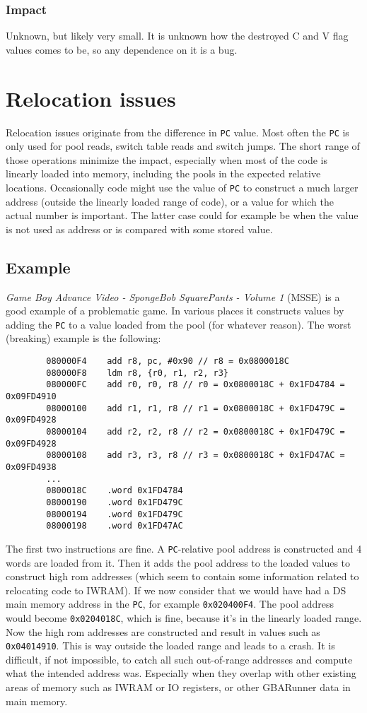 \documentclass[a4paper,10pt]{report}
\begin{document}
		\subsubsection{Impact}
		Unknown, but likely very small. It is unknown how the destroyed C and V flag values comes to be, so any dependence on it is a bug.
	
	\section{Relocation issues}
	Relocation issues originate from the difference in \texttt{PC} value. Most often the \texttt{PC} is only used for pool reads, switch table reads and switch jumps. The short range of those operations minimize the impact, especially when most of the code is linearly loaded into memory, including the pools in the expected relative locations. Occasionally code might use the value of \texttt{PC} to construct a much larger address (outside the linearly loaded range of code), or a value for which the actual number is important. The latter case could for example be when the value is not used as address or is compared with some stored value.
	
	\subsection{Example}
	\textit{Game Boy Advance Video - SpongeBob SquarePants - Volume 1} (MSSE) is a good example of a problematic game. In various places it constructs values by adding the \texttt{PC} to a value loaded from the pool (for whatever reason). The worst (breaking) example is the following:	
	\begin{verbatim}
		080000F4    add r8, pc, #0x90 // r8 = 0x0800018C
		080000F8    ldm r8, {r0, r1, r2, r3}
		080000FC    add r0, r0, r8 // r0 = 0x0800018C + 0x1FD4784 = 0x09FD4910
		08000100    add r1, r1, r8 // r1 = 0x0800018C + 0x1FD479C = 0x09FD4928
		08000104    add r2, r2, r8 // r2 = 0x0800018C + 0x1FD479C = 0x09FD4928
		08000108    add r3, r3, r8 // r3 = 0x0800018C + 0x1FD47AC = 0x09FD4938
		...
		0800018C    .word 0x1FD4784
		08000190    .word 0x1FD479C
		08000194    .word 0x1FD479C
		08000198    .word 0x1FD47AC
	\end{verbatim}
	The first two instructions are fine. A \texttt{PC}-relative pool address is constructed and 4 words are loaded from it. Then it adds the pool address to the loaded values to construct high rom addresses (which seem to contain some information related to relocating code to IWRAM). If we now consider that we would have had a DS main memory address in the \texttt{PC}, for example \texttt{0x020400F4}. The pool address would become \texttt{0x0204018C}, which is fine, because it's in the linearly loaded range. Now the high rom addresses are constructed and result in values such as \texttt{0x04014910}. This is way outside the loaded range and leads to a crash. It is difficult, if not impossible, to catch all such out-of-range addresses and compute what the intended address was. Especially when they overlap with other existing areas of memory such as IWRAM or IO registers, or other GBARunner data in main memory.
	
\end{document}
